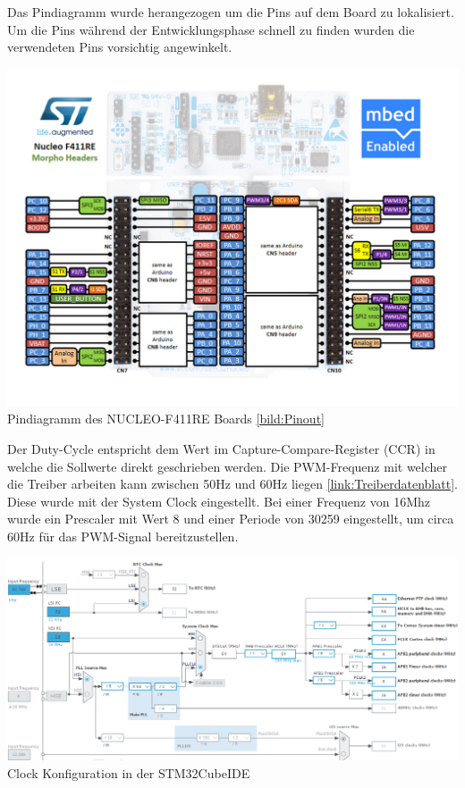 Das Pindiagramm wurde herangezogen um die Pins auf dem Board zu lokalisiert. Um die Pins während der Entwicklungsphase schnell zu finden wurden die verwendeten Pins vorsichtig angewinkelt.
\begin{center}
	\includegraphics[scale=0.14]{../images/0067 Pinout NUCLEO F411RE.jpeg}{\\Pindiagramm des NUCLEO-F411RE Boards \ref{bild:Pinout}}
\end{center}
Der Duty-Cycle entspricht dem Wert im Capture-Compare-Register (CCR) in welche die Sollwerte direkt geschrieben werden. Die PWM-Frequenz mit welcher die Treiber arbeiten kann zwischen 50Hz und 60Hz liegen \ref{link:Treiberdatenblatt}. Diese wurde mit der System Clock eingestellt. Bei einer Frequenz von 16Mhz wurde ein Prescaler mit Wert 8 und einer Periode von 30259 eingestellt, um circa 60Hz für das PWM-Signal bereitzustellen.
\begin{center}
	\includegraphics[scale=0.35]{../images/0065 Clock.png}{\\Clock Konfiguration in der STM32CubeIDE}
\end{center}
